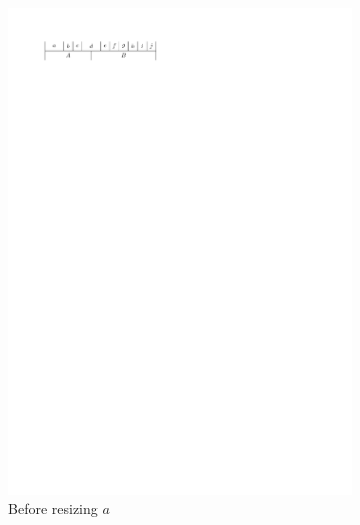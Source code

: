   \begin{figure}[b]
    \quad
    \begin{subfigure}[b]{0.45 \textwidth}
      \centering
      \includegraphics[width=\textwidth]{introduction/img/2sidedBefore.pdf}
      \caption{Before resizing $a$}
      \label{fig:intro:2sidedBefore}
    \end{subfigure}
    \hfill
    \begin{subfigure}[b]{0.45 \textwidth}
      \centering

\end{subfigure}
\end{figure}
